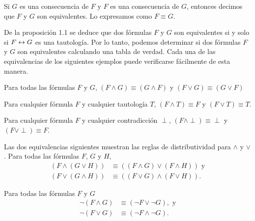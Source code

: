 \message{ !name(main.tex)}\documentclass[12pt,a4paper]{book}
\begin{document}
    \begin{definicion}[Equivalencia]
        Si $G$ es una consecuencia de $F$ y $F$ es una consecuencia de $G$, entonces decimos que $F$ y $G$ son equivalentes. Lo expresamos
        como $F\equiv G$.
    \end{definicion}

    De la proposición 1.1 se deduce que dos fórmulas $F$ y $G$ son equivalentes si y solo si $F\leftrightarrow G$ es una tautología. Por lo tanto, podemos determinar si dos fórmulas
    $F$ y $G$ son equivalentes calculando una tabla de verdad. Cada una de las equivalencias de los siguientes ejemplos puede verificarse fácilmente de esta manera.

    \begin{ejemplo}
        Para todas las fórmulas $F$ y $G$, $(F\wedge G)\equiv(G\wedge F)$ y $(F\vee G)\equiv(G\vee F)$
    \end{ejemplo}

    \vspace{1.5cm}

    \begin{ejemplo}
        Para cualquier fórmula $F$ y cualquier tautología $T$, $(F\wedge T)\equiv F$ y $(F\vee T)\equiv T$.
    \end{ejemplo}

    \begin{ejemplo}
        Para cualquier fórmula $F$ y cualquier contradicción $\perp$, $(F\wedge\perp)\equiv\perp$ y $(F\vee\perp)\equiv F$.
    \end{ejemplo}

    \begin{ejemplo}\label{ej:distributividad}
        Las dos equivalencias siguientes muestran las reglas de distributividad para $\wedge$ y $\vee$. Para todas las fórmulas $F$, $G$ y $H$,
        \begin{align*}
            (F\wedge(G\vee H))&\equiv((F\wedge G)\vee(F\wedge H))\text{ y}\\
            (F\vee(G\wedge H))&\equiv((F\vee G)\wedge(F\vee H)).
        \end{align*}
    \end{ejemplo}

    \begin{ejemplo}\label{ej:demorgan}
        Para todas las fórmulas $F$ y $G$
        \begin{align*}
            \neg(F\wedge G)&\equiv(\neg F\vee\neg G),\text{ y}\\
            \neg(F\vee G)&\equiv(\neg F\wedge\neg G).
        \end{align*}
    \end{ejemplo}
\end{document}
